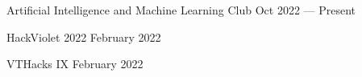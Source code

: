 Artificial Intelligence and Machine Learning Club \hfill Oct 2022 --- Present

HackViolet 2022 \hfill February 2022

VTHacks IX \hfill February 2022









